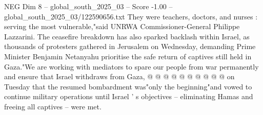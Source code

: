 \begin{textsample}{NEG Dim 8 – global\_south\_2025\_03 – Score -1.00 – global\_south\_2025\_03/122590656.txt}
They were teachers, doctors, and nurses : serving the most vulnerable,"said UNRWA Commissioner-General Philippe Lazzarini.
The ceasefire breakdown has also sparked backlash within Israel, as thousands of protesters gathered in Jerusalem on Wednesday, demanding Prime Minister Benjamin Netanyahu prioritise the safe return of captives still held in Gaza."We are working with mediators to spare our people from war permanently and ensure that Israel withdraws from Gaza, @ @ @ @ @ @ @ @ @ @ on Tuesday that the resumed bombardment was"only the beginning"and vowed to continue military operations until Israel ' s objectives -- eliminating Hamas and freeing all captives -- were met.

\end{textsample}
